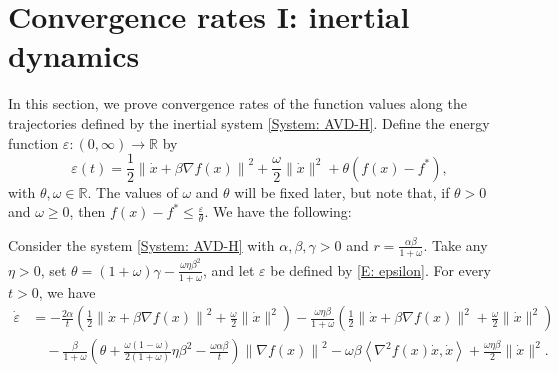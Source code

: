\documentclass[onefignum,onetabnum]{siamart220329}
\begin{document}
\section{Convergence rates I: inertial dynamics}\label{Sec: dynamics}
In this section, we prove convergence rates of the function values along the trajectories defined by the inertial system \eqref{System: AVD-H}. Define the energy function $\varepsilon:(0,\infty)\to\mathbb{R}$ by
\begin{equation}\label{E: epsilon}
\varepsilon(t) = \frac{1}{2}\left\| \dot{x} + \beta\nabla f(x) \right\|^2 + \frac{\omega}{2}\| \dot{x} \|^2 + \theta ( f(x) - f^* ),
\end{equation}
with $\theta,\omega\in\mathbb{R}$. The values of $\omega$ and $\theta$ will be fixed later, but note that, if $\theta>0$ and $\omega\ge 0$, then $f(x)-f^*\le \frac{\varepsilon}{\theta}$. We have the following:

\begin{proposition} \label{P:dot_e}
Consider the system \eqref{System: AVD-H} with $\alpha,\beta,\gamma>0$ and $r = \frac{\alpha\beta}{1+\omega}$. Take any $\eta>0$, set $\theta = (1+\omega) \gamma - \frac{\omega\eta\beta^2}{1+\omega}$, and let $\varepsilon$ be defined by \eqref{E: epsilon}. For every $t>0$, we have
\begin{align*} 
\dot{\varepsilon}
&= -\frac{2\alpha}{t} \left( \frac{1}{2}\left\| \dot{x} + \beta\nabla f(x) \right\|^2 + \frac{\omega}{2} \| \dot{x} \|^2 \right)
   -\frac{\omega\eta\beta}{1+\omega}\left( \frac{1}{2}\| \dot{x} + \beta\nabla f(x) \|^2
   + \frac{\omega}{2}\| \dot{x} \|^2 \right) \\
&\quad - \frac{\beta}{1+\omega}\left( \theta + \frac{\omega(1-\omega)}{2(1+\omega)}\eta\beta^2 - \frac{\omega\alpha\beta}{t} \right) \left\| \nabla f(x) \right\|^2
   - \omega\beta\left\langle \nabla^2 f(x)\dot{x}, \dot{x} \right\rangle
   + \frac{\omega\eta\beta}{2}\| \dot{x} \|^2.
\end{align*}   
\end{proposition}
\end{document}
